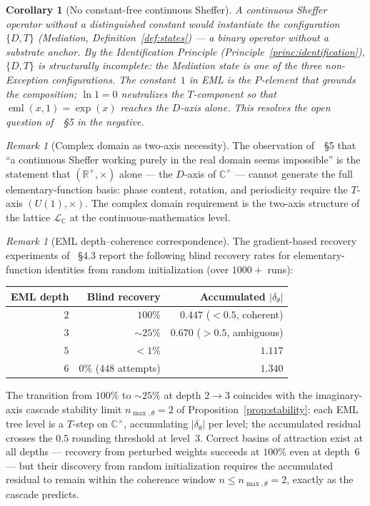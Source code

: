 \documentclass[11pt,a4paper]{article}
\newtheorem{corollary}[theorem]{Corollary}
\theoremstyle{definition}
\theoremstyle{remark}
\newtheorem{remark}[theorem]{Remark}
\newcommand{\R}{\mathbb{R}}
\newcommand{\C}{\mathbb{C}}
\begin{document}
\begin{corollary}[No constant-free continuous Sheffer]\label{cor:no-constantfree}
A continuous Sheffer operator without a distinguished constant would instantiate the configuration $\{D,T\}$ (Mediation, Definition~\ref{def:states}) --- a binary operator without a substrate anchor. By the Identification Principle (Principle~\ref{princ:identification}), $\{D,T\}$ is structurally incomplete: the Mediation state is one of the three non-Exception configurations. The constant~$1$ in EML is the $P$-element that grounds the composition; $\ln 1 = 0$ neutralizes the $T$-component so that $\operatorname{eml}(x,1) = \exp(x)$ reaches the $D$-axis alone. This resolves the open question of~\cite{Odrzywolek2026}~\S5 in the negative.
\end{corollary}

\begin{remark}[Complex domain as two-axis necessity]\label{rem:complex-domain}
The observation of~\cite{Odrzywolek2026}~\S5 that ``a continuous Sheffer working purely in the real domain seems impossible'' is the statement that $(\R^{+},\times)$ alone --- the $D$-axis of $\C^{\times}$ --- cannot generate the full elementary-function basis: phase content, rotation, and periodicity require the $T$-axis $(U(1),\times)$. The complex domain requirement is the two-axis structure of the lattice $\mathcal{L}_{\C}$ at the continuous-mathematics level.
\end{remark}

\begin{remark}[EML depth--coherence correspondence]\label{rem:eml-depth}
The gradient-based recovery experiments of~\cite{Odrzywolek2026} \S4.3 report the following blind recovery rates for elementary-function identities from random initialization (over $1000+$ runs):
\begin{center}
\begin{tabular}{@{}r r r@{}}
\toprule
EML depth & Blind recovery & Accumulated $|\delta_{\theta}|$\\
\midrule
$2$ & $100\%$ & $0.447$ ($< 0.5$, coherent)\\
$3$ & $\sim 25\%$ & $0.670$ ($> 0.5$, ambiguous)\\
$5$ & $<1\%$ & $1.117$\\
$6$ & $0\%$ ($448$ attempts) & $1.340$\\
\bottomrule
\end{tabular}
\end{center}
The transition from $100\%$ to $\sim 25\%$ at depth $2 \to 3$ coincides with the imaginary-axis cascade stability limit $n_{\max,\theta}=2$ of Proposition~\ref{prop:stability}: each EML tree level is a $T$-step on $\C^{\times}$, accumulating $|\delta_{\theta}|$ per level; the accumulated residual crosses the $0.5$ rounding threshold at level~$3$. Correct basins of attraction exist at all depths --- recovery from perturbed weights succeeds at $100\%$ even at depth~$6$ --- but their discovery from random initialization requires the accumulated residual to remain within the coherence window $n \le n_{\max,\theta}=2$, exactly as the cascade predicts.
\end{remark}
\end{document}
